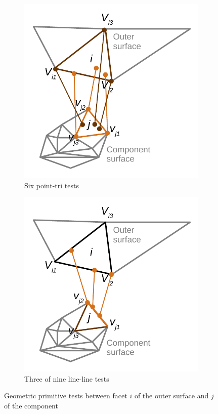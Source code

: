 \documentclass[11pt,letterpaper]{article}
\begin{document}
\begin{figure}[ht]
  \begin{subfigure}[b]{0.48\textwidth}
    \includegraphics[width=\textwidth]{figures/point-tri.pdf}
    \caption{Six point-tri tests}
    \label{fig:point-tri}
  \end{subfigure}
  \hfill
  \begin{subfigure}[b]{0.48\textwidth}
    \includegraphics[width=\textwidth]{figures/edge_edge.pdf}
    \caption{Three of nine line-line tests}
    \label{fig:line-line}
  \end{subfigure}
  \caption{Geometric primitive tests between facet $i$ of the outer surface and $j$ of the component}
  \label{fig:primitives}
\end{figure}
\end{document}
